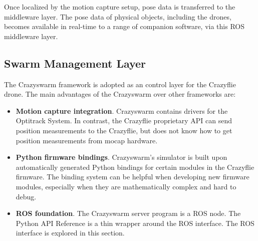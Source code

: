 Once localized by the motion capture setup, pose data is transferred to the middleware layer. The pose data of physical objects, including the drones, becomes available in real-time to a range of companion software, via this ROS middleware layer.





\pagebreak
\subsection{Swarm Management Layer}\label{section:swarm}

The Crazyswarm framework \cite{crazyswarm_docs} is adopted as an control layer for the Crazyflie drone. The main advantages of the Crazyswarm over other frameworks are:
\begin{itemize}
    \item	\textbf{Motion capture integration}. Crazyswarm contains drivers for the Optitrack System. In contrast, the Crazyflie proprietary API can send position measurements to the Crazyflie, but does not know how to get position measurements from mocap hardware.
    \item	\textbf{Python firmware bindings}. Crazyswarm’s simulator is built upon automatically generated Python bindings for certain modules in the Crazyflie firmware. The binding system can be helpful when developing new firmware modules, especially when they are mathematically complex and hard to debug.
    \item   \textbf{ROS foundation}. The Crazyswarm server program is a ROS node. The Python API Reference is a thin wrapper around the ROS interface. The ROS interface is explored in this section.
\end{itemize}


